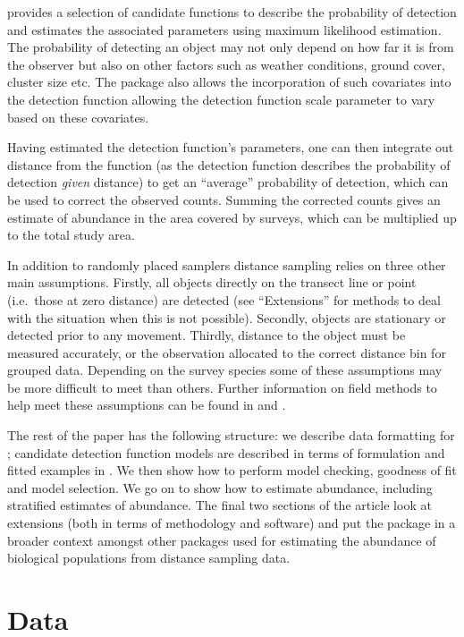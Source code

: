 \documentclass[article]{jss}
\begin{document}
 provides a selection of candidate functions to describe
the probability of detection and estimates the associated parameters
using maximum likelihood estimation. The probability of detecting an
object may not only depend on how far it is from the observer but also
on other factors such as weather conditions, ground cover, cluster size
etc. The  package also allows the incorporation of such
covariates into the detection function allowing the detection function
scale parameter to vary based on these covariates.

Having estimated the detection function's parameters, one can then
integrate out distance from the function (as the detection function
describes the probability of detection \emph{given} distance) to get an
``average'' probability of detection, which can be used to correct the
observed counts. Summing the corrected counts gives an estimate of
abundance in the area covered by surveys, which can be multiplied up to
the total study area.

In addition to randomly placed samplers distance sampling relies on
three other main assumptions. Firstly, all objects directly on the
transect line or point (i.e.~those at zero distance) are detected (see
``Extensions'' for methods to deal with the situation when this is not
possible). Secondly, objects are stationary or detected prior to any
movement. Thirdly, distance to the object must be measured accurately,
or the observation allocated to the correct distance bin for grouped
data. Depending on the survey species some of these assumptions may be
more difficult to meet than others. Further information on field methods
to help meet these assumptions can be found in \citet{Buckland:2001vm}
and \citet{buckland2015distance}.

The rest of the paper has the following structure: we describe data
formatting for ; candidate detection function models are
described in terms of formulation and fitted examples in .
We then show how to perform model checking, goodness of fit and model
selection. We go on to show how to estimate abundance, including
stratified estimates of abundance. The final two sections of the article
look at extensions (both in terms of methodology and software) and put
the package in a broader context amongst other  packages
used for estimating the abundance of biological populations from
distance sampling data.

\section{Data}\label{data}
\end{document}
